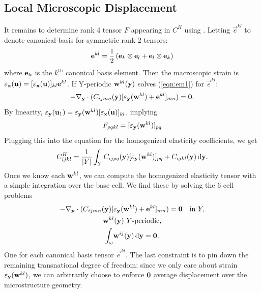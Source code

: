 \documentclass[twocolumn,10pt]{article}
\begin{document}
\subsection{Local Microscopic Displacement}
It remains to determine rank 4 tensor $F$ appearing in $C^H$ using
. Letting $\vec{e}^{kl}$ to denote canonical basis for
symmetric rank 2 tensors:
\[
\vec{e}^{kl} = \frac{1}{2} \left({\bf e}_k \otimes {\bf e}_l + {\bf
  e}_l \otimes {\bf e}_k \right)
\]
where ${\bf e}_k$ is the $k^\text{th}$ canonical basis element. Then
the macroscopic strain is $\strain_{\x}({\bf u}) = [\strain_{\x}({\bf
    u})]_{kl}\vec{e}^{kl}$. If Y-periodic ${\bf w}^{kl}({\y})$ solves
(\ref{eqn:em1}) for $\vec{e}^{kl}$:
\begin{equation}
-\nabla_{\y} \cdot (C_{ijmn}(\y)[\strain_\y({\bf w}^{kl}) +
  \vec{e}^{kl}]_{mn}) = {\bf 0}.
\end{equation}
By linearity, $\strain_{\y}({\bf u}_1) = \strain_{\y}({\bf
  w}^{kl})[\strain_{\x}({\bf u})]_{kl}$, implying
\begin{equation}
F_{pqkl} = [\strain_{\y}({\bf w}^{kl})]_{pq}
\end{equation}
Plugging this into the equation for the homogenized elasticity
coefficients, we get
\begin{equation}
    \label{eqn:Eh}
    C^H_{ijkl}= \frac{1}{|Y|} \int_Y C_{ijpq}({\y}) [\strain_{\y}({\bf
        w}^{kl})]_{pq} + C_{ijkl}({\y}) \, \mathrm{d} {\y}.
\end{equation}
Once we know each ${\bf w}^{kl}$, we can compute the homogenized
elasticity tensor with a simple integration over the base cell. We
find these by solving the 6 cell problems
\begin{subequations}
  \begin{gather}
    -\nabla_{\y} \cdot (C_{ijmn}({\y})[\strain_{\y}({\bf w}^{kl}) + \vec{e}^{kl}]_{mn}) = {\bf 0} \quad \text{in } Y, \\
    {\bf w}^{kl}({\y})\ Y \text{-periodic}, \\
    \int_\omega \! {\bf w}^{ij}({\y})  \, \mathrm{d} {\y} =  {\bf 0}.
  \end{gather}
\end{subequations}
One for each canonical basis tensor $\vec{e}^{kl}$. The last
constraint is to pin down the remaining transnational degree of
freedom; since we only care about strain $\strain_{\y}({\bf w}^{kl})$,
we can arbitrarily choose to enforce ${\bf 0}$ average displacement
over the microstructure geometry.



\end{document}
